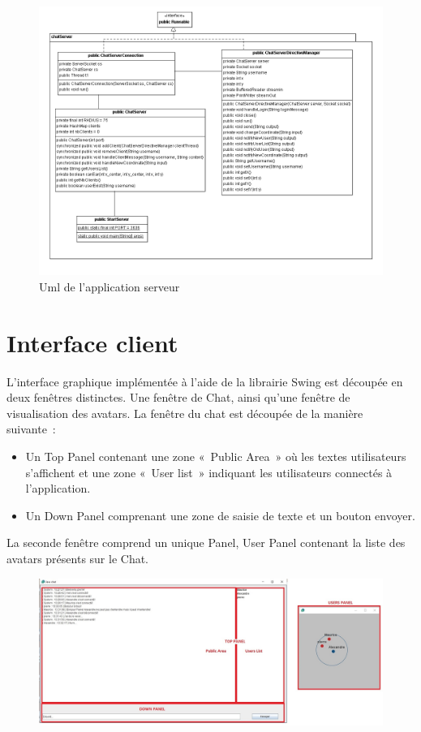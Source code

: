 \documentclass[a4paper,12pt]{report}
\begin{document}
      \begin{figure}[!ht]%
        \centering 
        \includegraphics[width=16cm]{umlServeur.png}
        \caption{Uml de l'application serveur}
      \end{figure}

  \chapter{Interface client}

    L’interface graphique implémentée à l’aide de la librairie Swing est découpée en deux fenêtres distinctes. Une fenêtre de Chat, ainsi qu’une fenêtre de visualisation des avatars.
    \medbreak
    La fenêtre du chat est découpée de la manière suivante :
    \begin{itemize}
      \item Un Top Panel contenant une zone « Public Area » où les textes utilisateurs s’affichent et une zone « User list » indiquant les utilisateurs connectés à l’application.
      \item Un Down Panel comprenant une zone de saisie de texte et un bouton envoyer.
    \end{itemize}
    \bigbreak
    La seconde fenêtre comprend un unique Panel, User Panel contenant la liste des avatars présents sur le Chat.
    \medbreak

    \begin{figure}[!ht]%
      \centering 
      \includegraphics[width=16cm]{javaChatZonePrez.jpg}
    \end{figure}
    \bigbreak
\end{document}
